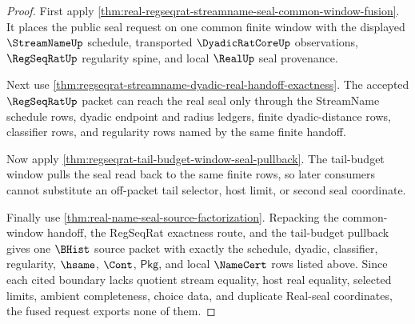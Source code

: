 \begin{proof}
First apply \autoref{thm:real-regseqrat-streamname-seal-common-window-fusion}. It places the public seal request on one common finite window with the displayed $\StreamNameUp$ schedule, transported $\DyadicRatCoreUp$ observations, $\RegSeqRatUp$ regularity spine, and local $\RealUp$ seal provenance.

Next use \autoref{thm:regseqrat-streamname-dyadic-real-handoff-exactness}. The accepted $\RegSeqRatUp$ packet can reach the real seal only through the StreamName schedule rows, dyadic endpoint and radius ledgers, finite dyadic-distance rows, classifier rows, and regularity rows named by the same finite handoff.

Now apply \autoref{thm:regseqrat-tail-budget-window-seal-pullback}. The tail-budget window pulls the seal read back to the same finite rows, so later consumers cannot substitute an off-packet tail selector, host limit, or second seal coordinate.

Finally use \autoref{thm:real-name-seal-source-factorization}. Repacking the common-window handoff, the RegSeqRat exactness route, and the tail-budget pullback gives one $\BHist$ source packet with exactly the schedule, dyadic, classifier, regularity, $\hsame$, $\Cont$, $\mathsf{Pkg}$, and local $\NameCert$ rows listed above. Since each cited boundary lacks quotient stream equality, host real equality, selected limits, ambient completeness, choice data, and duplicate Real-seal coordinates, the fused request exports none of them.
\end{proof}

